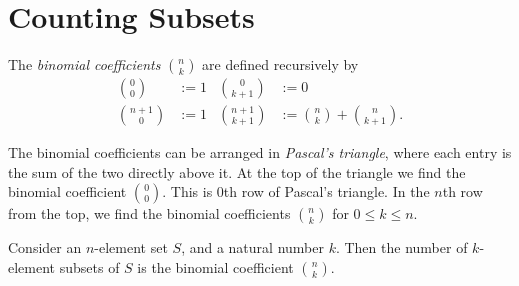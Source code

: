 \section{Counting Subsets}

\begin{definition}
  The \emph{binomial coefficients} \(\binom{n}{k}\) are defined recursively by
  \begin{align*}
    \binom{0}{0} & := 1 & \binom{0}{k+1} & := 0 \\
    \binom{n+1}{0} & := 1 & \binom{n+1}{k+1} & := \binom{n}{k} + \binom{n}{k+1}.
  \end{align*}
\end{definition}

The binomial coefficients can be arranged in \emph{Pascal's triangle}, where each entry is the sum of the two directly above it. At the top of the triangle we find the binomial coefficient $\binom{0}{0}$. This is $0$th row of Pascal's triangle. In the $n$th row from the top, we find the binomial coefficients $\binom{n}{k}$ for $0\leq k\leq n$.

\begin{center}
\end{center}

\begin{theorem}
  Consider an \(n\)-element set \(S\), and a natural number \(k\). Then the number of \(k\)-element subsets of \(S\) is the binomial coefficient \(\binom{n}{k}\).
\end{theorem}


